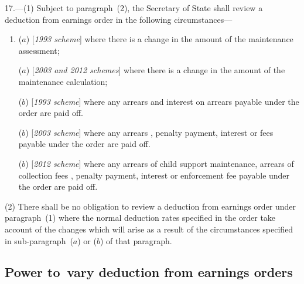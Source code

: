 \documentclass[12pt,a4paper]{article}
\begin{document}
17.—(1) Subject to paragraph~(2), the Secretary of State shall review a deduction from earnings order in the following circumstances—
\begin{enumerate}\item[]
($a$) [\emph{1993 scheme}] where there is a change in the amount of the maintenance assessment;

($a$) [\emph{2003 and 2012 schemes}] where there is a change in the amount of the maintenance 
calculation;  %

($b$) [\emph{1993 scheme}] where any arrears and interest on arrears payable under the order are paid off.

($b$) [\emph{2003 scheme}] where any arrears%
, penalty payment, interest or fees  %
payable under the order are paid off.

($b$) [\emph{2012 scheme}] where any arrears
of child support maintenance, arrears of collection fees%
% 
, penalty payment, interest or 
enforcement fee  %
payable under the order are paid off.
\end{enumerate}

(2) There shall be no obligation to review a deduction from earnings order under paragraph~(1) where the normal deduction rates specified in the order take account of the changes which will arise as a result of the circumstances specified in sub-paragraph~($a$) or ($b$) of that paragraph.


\subsection[18. Power to~vary deduction from earnings orders]{Power to~vary deduction from earnings orders}
\end{document}
